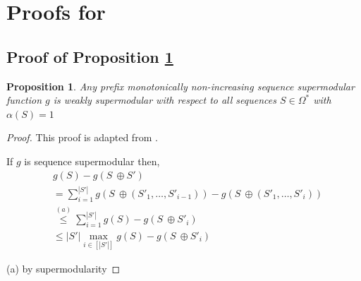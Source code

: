 \documentclass{article}
\newtheorem{proposition}[theorem]{Proposition}
\begin{document}

\section{Proofs for } \label{sec:proofgreedy}

\subsection{Proof of Proposition \ref{th:alpha=1}} \label{sec:proofalpha=1}

\begin{proposition} \label{th:alpha=1}
    Any prefix monotonically non-increasing sequence supermodular function $g$ is weakly supermodular with respect to all sequences $S \in \Omega^*$ with $\alpha(S) = 1$
\end{proposition}

\begin{proof}

This proof is adapted from \citet{liberty2017greedy}.

If $g$ is sequence supermodular then,
\begin{align*}
    &g(S) - g(S \ \oplus S' ) \\
    &= \sum_{i = 1}^{|S'|} g(S \ \oplus \left(S'_1, \dots, S'_{i - 1}\right)) - g(S \ \oplus \left(S'_1, \dots, S'_{i}\right)) \\
    &\overset{(a)}{\leq} \sum_{i = 1}^{|S'|} g(S) - g(S \ \oplus  S'_{i}) \\
    &\leq |S'|\max_{i \in [|S'|]} g(S) - g(S \ \oplus  S'_{i})
\end{align*}

(a) by supermodularity


\end{proof}
\end{document}
